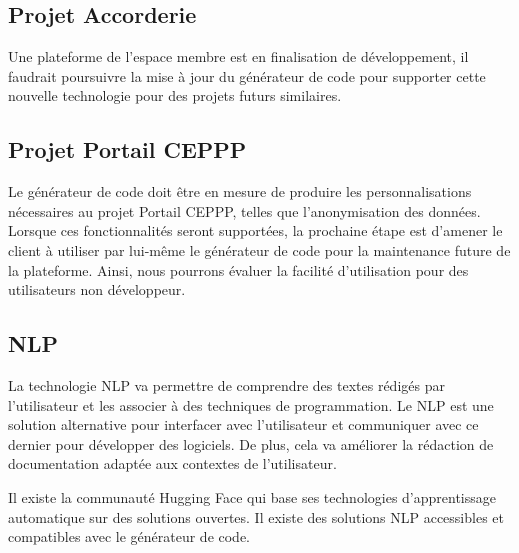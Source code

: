\subsection{Projet Accorderie}

Une plateforme de l'espace membre est en finalisation de développement, il faudrait poursuivre la mise à jour du générateur de code pour supporter cette nouvelle technologie pour des projets futurs similaires.


\subsection{Projet Portail CEPPP}

Le générateur de code doit être en mesure de produire les personnalisations nécessaires au projet Portail CEPPP, telles que l'anonymisation des données. Lorsque ces fonctionnalités seront supportées, la prochaine étape est d'amener le client à utiliser par lui-même le générateur de code pour la maintenance future de la plateforme. Ainsi, nous pourrons évaluer la facilité d'utilisation pour des utilisateurs non développeur.

\subsection{NLP}
La technologie NLP va permettre de comprendre des textes rédigés par l’utilisateur et les associer à des techniques de programmation. Le NLP est une solution alternative pour interfacer avec l’utilisateur et communiquer avec ce dernier pour développer des logiciels. De plus, cela va améliorer la rédaction de documentation adaptée aux contextes de l'utilisateur. 

Il existe la communauté Hugging Face qui base ses technologies d'apprentissage automatique sur des solutions ouvertes. Il existe des solutions NLP accessibles et compatibles avec le générateur de code.




